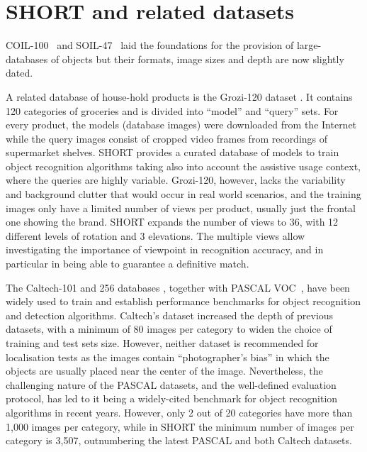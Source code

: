 \section{SHORT and related datasets} \label{sec:related-work}

COIL-100~\cite{Nene1996a} and SOIL-47~\cite{Koubaroulis2002} laid the foundations for the provision of large-databases of objects but their formats, image sizes and depth are now slightly dated.

A related database of house-hold products is the Grozi-120 dataset \cite{Merler2007}. It contains 120 categories of groceries and is divided into ``model'' and ``query'' sets. For every product, the models (database images) were downloaded from the Internet while the query images consist of cropped video frames from recordings of supermarket shelves. SHORT provides a curated database of models to train object recognition algorithms taking also into account the assistive usage context, where the queries are highly variable. Grozi-120, however, lacks the variability and background clutter that would occur in real world scenarios, and the training images only have a limited number of views per product, usually just the frontal one showing the brand. SHORT expands the number of views to 36, with 12 different levels of rotation and 3 elevations.  The multiple views allow investigating the importance of viewpoint in recognition accuracy, and in particular in being able to guarantee a definitive match. 

The Caltech-101 and 256 databases \cite{Feifei2007,Griffin2007}, together with PASCAL VOC~\cite{Everingham2009}, have been widely used to train and establish performance benchmarks for object recognition and detection algorithms. Caltech's dataset increased the depth of previous datasets, with a minimum of 80 images per category to widen the choice of training and test sets size. However, neither dataset is recommended for localisation tests as the images contain ``photographer's bias'' in which the objects are usually placed near the center of the image. Nevertheless, the challenging nature of the PASCAL datasets, and the well-defined evaluation protocol, has led to it being a widely-cited benchmark for object recognition algorithms in recent years. However, only 2 out of 20 categories have more than 1,000 images per category, while in SHORT the minimum number of images per category is 3,507, outnumbering the latest PASCAL and both Caltech datasets.
 
